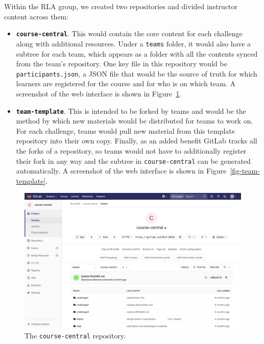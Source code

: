 \documentclass[12pt,twoside]{mitthesis}
\begin{document}
{Within the RLA group, we created two repositories and divided instructor content across them:
\begin{itemize}
	\item \textbf{\texttt{course-central}}. This would contain the core content for each challenge along with additional resources. Under a \texttt{teams} folder, it would also have a subtree for each team, which appears as a folder with all the contents synced from the team's repository. One key file in this repository would be \texttt{participants.json}, a JSON file that would be the source of truth for which learners are registered for the course and for who is on which team. A screenshot of the web interface is shown in Figure~\ref{fig-course-central}.
	\item \textbf{\texttt{team-template}}. This is intended to be forked by teams and would be the method by which new materials would be distributed for teams to work on. For each challenge, teams would pull new material from this template repository into their own copy. Finally, as an added benefit GitLab tracks all the forks of a repository, so teams would not have to additionally register their fork in any way and the subtree in \texttt{course-central} can be generated automatically. A screenshot of the web interface is shown in Figure~\ref{fig-team-template}.
\end{itemize}
}

\begin{figure}[h]
\centering
\includegraphics[scale=0.3]{fig-course-central.png}
\caption{\label{fig-course-central} The \texttt{course-central} repository.}
\end{figure}
\end{document}
